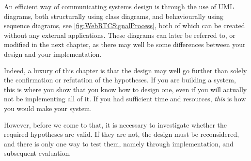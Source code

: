 An efficient way of communicating systems design is through the use of
\ac{UML} diagrams, both structurally using class diagrams, and
behaviourally using sequence diagrams, see
\autoref{fig:WebRTCSignalProcess}, both of which can be created
without any external applications.  These diagrams can later be
referred to, or modified in the next chapter, as there may well be
some differences between your design and your implementation.

Indeed, a luxury of this chapter is that the design may well go further
than solely the confirmation or refutation of the hypotheses.  If you
are building a system, this is where you show that you know how to
design one, even if you will actually not be implementing all of it.
If you had sufficient time and resources, \emph{this} is how you would make
your system.

However, before we come to that, it is necessary to investigate
whether the required hypotheses are valid. If they are not, the design
must be reconsidered, and there is only one way to test them, namely
through implementation, and subsequent evaluation.


